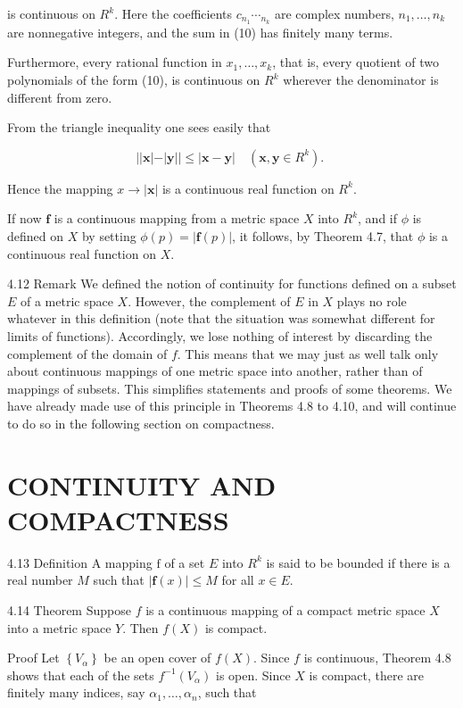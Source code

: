 \documentclass[10pt]{article}
\begin{document}
is continuous on $R^{k}$. Here the coefficients $c_{n_{1}} \cdots_{n_{k}}$ are complex numbers, $n_{1}, \ldots, n_{k}$ are nonnegative integers, and the sum in (10) has finitely many terms.

Furthermore, every rational function in $x_{1}, \ldots, x_{k}$, that is, every quotient of two polynomials of the form (10), is continuous on $R^{k}$ wherever the denominator is different from zero.

From the triangle inequality one sees easily that

$$
|| \mathbf{x}|-| \mathbf{y}|| \leq|\mathbf{x}-\mathbf{y}| \quad\left(\mathbf{x}, \mathbf{y} \in R^{k}\right) \text {. }
$$

Hence the mapping $x \rightarrow|\mathbf{x}|$ is a continuous real function on $R^{k}$.

If now $\mathbf{f}$ is a continuous mapping from a metric space $X$ into $R^{k}$, and if $\phi$ is defined on $X$ by setting $\phi(p)=|\mathbf{f}(p)|$, it follows, by Theorem 4.7, that $\phi$ is a continuous real function on $X$.

4.12 Remark We defined the notion of continuity for functions defined on a subset $E$ of a metric space $X$. However, the complement of $E$ in $X$ plays no role whatever in this definition (note that the situation was somewhat different for limits of functions). Accordingly, we lose nothing of interest by discarding the complement of the domain of $f$. This means that we may just as well talk only about continuous mappings of one metric space into another, rather than of mappings of subsets. This simplifies statements and proofs of some theorems. We have already made use of this principle in Theorems 4.8 to 4.10, and will continue to do so in the following section on compactness.

\section{CONTINUITY AND COMPACTNESS}
4.13 Definition A mapping $\mathrm{f}$ of a set $E$ into $R^{k}$ is said to be bounded if there is a real number $M$ such that $|\mathbf{f}(x)| \leq M$ for all $x \in E$.

4.14 Theorem Suppose $f$ is a continuous mapping of a compact metric space $X$ into a metric space $Y$. Then $f(X)$ is compact.

Proof Let $\left\{V_{\alpha}\right\}$ be an open cover of $f(X)$. Since $f$ is continuous, Theorem 4.8 shows that each of the sets $f^{-1}\left(V_{\alpha}\right)$ is open. Since $X$ is compact, there are finitely many indices, say $\alpha_{1}, \ldots, \alpha_{n}$, such that
\end{document}
